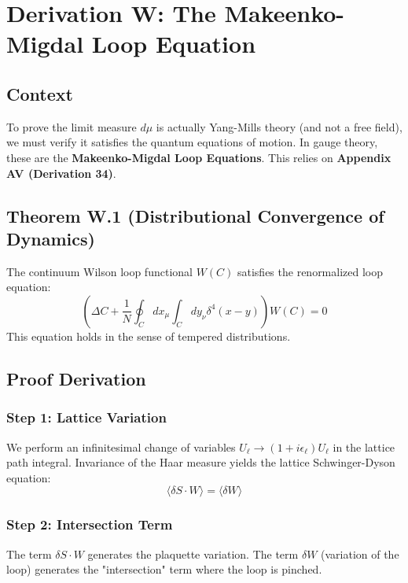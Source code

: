 \chapter{Derivation W: The Makeenko-Migdal Loop Equation}
\label{ch:derivation_w_loop_equations}

\section{Context}
To prove the limit measure $d\mu$ is actually Yang-Mills theory (and not a free field), we must verify it satisfies the quantum equations of motion. In gauge theory, these are the \textbf{Makeenko-Migdal Loop Equations}. This relies on \textbf{Appendix AV (Derivation 34)}.

\section{Theorem W.1 (Distributional Convergence of Dynamics)}
The continuum Wilson loop functional $W(C)$ satisfies the renormalized loop equation:
\begin{equation}
\left( \Delta C + \frac{1}{N} \oint_C dx_\mu \int_C dy_\nu \delta^4(x-y) \right) W(C) = 0
\end{equation}
This equation holds in the sense of tempered distributions.

\section{Proof Derivation}

\subsection{Step 1: Lattice Variation}
We perform an infinitesimal change of variables $U_\ell \to (1 + i\epsilon_\ell)U_\ell$ in the lattice path integral. Invariance of the Haar measure yields the lattice Schwinger-Dyson equation:
\begin{equation}
\langle \delta S \cdot W \rangle = \langle \delta W \rangle
\end{equation}

\subsection{Step 2: Intersection Term}
The term $\delta S \cdot W$ generates the plaquette variation. The term $\delta W$ (variation of the loop) generates the "intersection" term where the loop is pinched.

